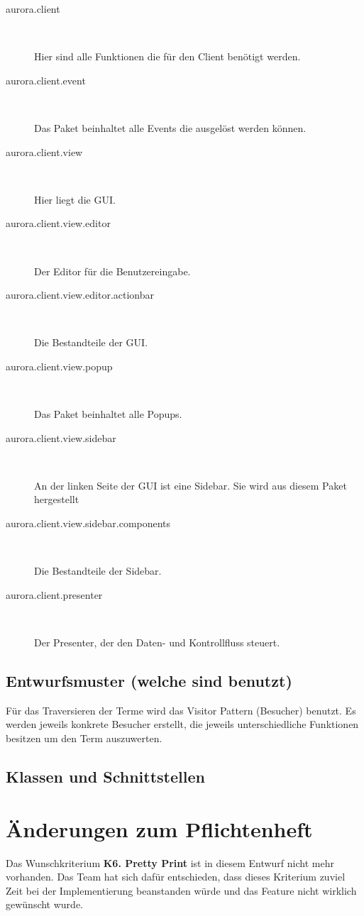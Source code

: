 \documentclass[parskip=full,11pt,twoside]{scrbook}
\begin{document}
\begin{description}
	\item[aurora.client] ~\par
	Hier sind alle Funktionen die für den Client benötigt werden.
	
	\item[aurora.client.event] ~\par
	Das Paket beinhaltet alle Events die ausgelöst werden können.
	
	\item[aurora.client.view] ~\par
	Hier liegt die GUI.
	
	\item[aurora.client.view.editor] ~\par
	Der Editor für die Benutzereingabe.
	
	\item[aurora.client.view.editor.actionbar] ~\par
	Die Bestandteile der GUI.
	
	\item[aurora.client.view.popup] ~\par
	Das Paket beinhaltet alle Popups.
	
	\item[aurora.client.view.sidebar] ~\par
	An der linken Seite der GUI ist eine Sidebar. Sie wird aus diesem Paket hergestellt
	
	\item[aurora.client.view.sidebar.components] ~\par 
	Die Bestandteile der Sidebar.
	
	\item[aurora.client.presenter] ~\par
	Der Presenter, der den Daten- und Kontrollfluss steuert.
\end{description}
\subsection{Entwurfsmuster (welche sind benutzt)}
Für das Traversieren der Terme wird das Visitor Pattern (Besucher) benutzt. Es werden jeweils konkrete Besucher erstellt, die jeweils unterschiedliche Funktionen besitzen um den Term auszuwerten.
\subsection{Klassen und Schnittstellen}
\pagebreak

\section{Änderungen zum Pflichtenheft}
Das Wunschkriterium \textbf{K6. Pretty Print} ist in diesem Entwurf nicht mehr vorhanden. Das Team hat sich dafür entschieden, dass dieses Kriterium zuviel Zeit bei der Implementierung beanstanden würde und das Feature nicht wirklich gewünscht wurde.
\end{document}
